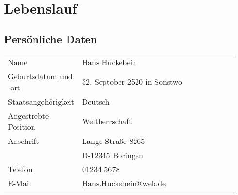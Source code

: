 \documentclass[11pt,parskip=half-]{scrartcl}
\newlength{\Lineskip}
\newenvironment{Abschnitt}[1][0em]
{%
	\begin{spacing}{1.0}
    \begin{longtable}{p{0.25\linewidth}p{0.69\linewidth}}%
}
{%
    \end{longtable}%
    \end{spacing}
    \vspace{-10 pt}%
}
\begin{document}
\section{Lebenslauf}

	\subsection{Persönliche Daten}
	\begin{Abschnitt}
	Name & Hans Huckebein \\[\Lineskip]
	Geburtsdatum und -ort & 32. Septober 2520 in Sonstwo \\[\Lineskip]
	Staatsangehörigkeit & Deutsch \\[\Lineskip]
	Angestrebte Position & Weltherrschaft \\[\Lineskip] %
	Anschrift & Lange Straße 8265 \\ 
	& D-12345 Boringen \\[\Lineskip]
	Telefon &  01234 5678 \\[\Lineskip]
	E-Mail & \href{mailto:Hans.Huckebein@web.de}{Hans.Huckebein@web.de}
	\end{Abschnitt}
	
\end{document}
